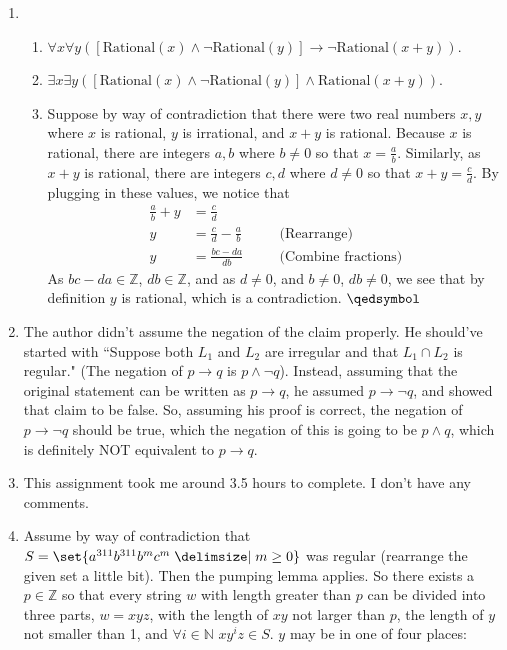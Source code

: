 \documentclass[12pt]{article}
\def\mbb#1{\mathbb{#1}}
\def\bN{\mbb{N}}
\def\bZ{\mbb{Z}}
\theoremstyle{definition}
\theoremstyle{remark}
\renewcommand{\qed}{\hfill\qedsymbol}
\newcommand{\justif}[1]{&\quad &\text{(#1)}}
\newcommand{\ra}{\rightarrow}
\begin{document}
\begin{enumerate}[leftmargin=\labelsep]
		\newpage
		\item 
		\begin{enumerate}
			\item $\forall x \forall y ([\mathrm{Rational}(x) \land \lnot \mathrm{Rational}(y)] \ra \lnot \mathrm{Rational}(x+y))$.
			\item $\exists x \exists y ([\mathrm{Rational}(x) \land \lnot \mathrm{Rational}(y)] \land \mathrm{Rational}(x+y))$.
			\item Suppose by way of contradiction that there were two real numbers $x, y$ where $x$ is rational, $y$ is irrational, and $x+y$ is rational. Because $x$ is rational, there are integers $a, b$ where $b \neq 0$ so that $x = \frac ab$. Similarly, as $x+y$ is rational, there are integers $c, d$ where $d \neq 0$ so that $x+y = \frac cd$. By plugging in these values, we notice that
			\begin{align*}
				\frac ab + y &= \frac cd \\
				y &= \frac cd - \frac ab \justif{Rearrange} \\
				y &= \frac {bc-da}{db} \justif{Combine fractions}
			\end{align*}
			As $bc - da \in \bZ$, $db \in \bZ$, and as $d \neq 0$, and $b \neq 0$, $db \neq 0$, we see that by definition $y$ is rational, which is a contradiction. $\qed$
		\end{enumerate}
	
		\newpage
		\item The author didn't assume the negation of the claim properly. He should've started with ``Suppose both $L_1$ and $L_2$ are irregular and that $L_1 \cap L_2$ is regular." (The negation of $p \ra q$ is $p \land \lnot q$). Instead, assuming that the original statement can be written as $p \ra q$, he assumed $p \ra \lnot q$, and showed that claim to be false. So, assuming his proof is correct, the negation of $p \ra \lnot q$ should be true, which the negation of this is going to be $p \land q$, which is definitely NOT equivalent to $p \ra q$.
		
		\newpage
		\item This assignment took me around 3.5 hours to complete. I don't have any comments.
		
		\newpage
		\item Assume by way of contradiction that $S = \set{a^{311}b^{311}b^mc^m \given m \geq 0}$ was regular (rearrange the given set a little bit). Then the pumping lemma applies. So there exists a $p \in \bZ$ so that every string $w$ with length greater than $p$ can be divided into three parts, $w = xyz$, with the length of $xy$ not larger than $p$, the length of $y$ not smaller than 1, and $\forall i \in \bN$ $xy^iz \in S$. $y$ may be in one of four places:
		

\end{enumerate}
\end{document}
